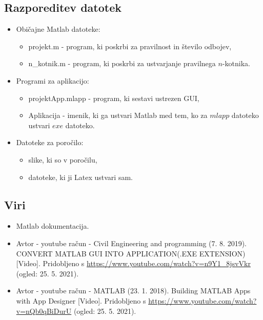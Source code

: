 \documentclass[12pt]{article}
\begin{document}
\subsection{Razporeditev datotek}

\begin{itemize}
	\item
	Običajne Matlab datoteke:
	\begin{itemize}
		\item
		projekt.m - program, ki poskrbi za pravilnost in število odbojev,
		\item
		n\_kotnik.m - program, ki poskrbi za ustvarjanje pravilnega $n$-kotnika.
	\end{itemize}
	\item
	Programi za aplikacijo:
	\begin{itemize}
		\item
		projektApp.mlapp - program, ki sestavi ustrezen GUI,
		\item
		Aplikacija - imenik, ki ga ustvari Matlab med tem, ko za $mlapp$ datoteko ustvari $exe$ datoteko.
	\end{itemize}
	\item
	Datoteke za poročilo:
	\begin{itemize}
		\item
		slike, ki so v poročilu,
		\item
		datoteke, ki ji Latex ustvari sam.
	\end{itemize}
\end{itemize}

\subsection{Viri}

\begin{itemize}
	\item
	Matlab dokumentacija.
	\item
	Avtor - youtube račun - Civil Engineering and programming (7. 8. 2019). CONVERT MATLAB GUI INTO APPLICATION(.EXE EXTENSION) [Video]. Pridobljeno s \url{https://www.youtube.com/watch?v=n9Y1_8jsvVkr} (ogled: 25. 5. 2021).
	\item
	Avtor - youtube račun - MATLAB (23. 1. 2018). Building MATLAB Apps with App Designer [Video]. Pridobljeno s \url{https://www.youtube.com/watch?v=nQb0qBiDurU} (ogled: 25. 5. 2021).
\end{itemize}
\end{document}
